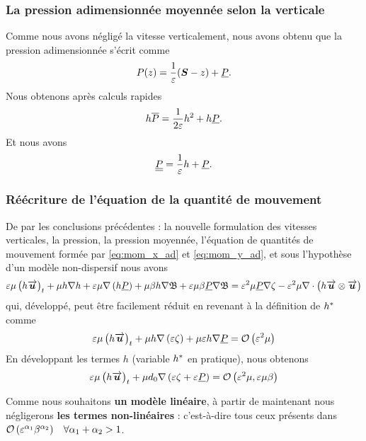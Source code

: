 \subsubsection{La pression adimensionnée moyennée selon la verticale}
\noindent Comme nous avons négligé la vitesse verticalement, nous avons obtenu que la pression adimensionnée s'écrit comme
\begin{equation*}
	P(z) =  \frac{1}{\varepsilon}(\boldsymbol{S}- z) +\underline{P}.
\end{equation*}
Nous obtenons après calculs rapides
\begin{equation}
	h\overline{P} = \frac{1}{2\varepsilon}h^2 + h\underline{P}.
\end{equation}
Et nous avons 
\begin{equation}
	\underline{\underline{P}} = \frac{1}{\varepsilon}h + \underline{P}.
\end{equation}

\subsubsection{Réécriture de l'équation de la quantité de mouvement}
\noindent De par les conclusions précédentes : la nouvelle formulation des vitesses verticales, la pression, la pression moyennée, l'équation de quantités de mouvement formée par \eqref{eq:mom_x_ad} et \eqref{eq:mom_y_ad}, et sous l'hypothèse d'un modèle non-dispersif nous avons
\begin{equation}
	\varepsilon\mu\left(h\overrightarrow{\boldsymbol{u}}\right)_t + \mu h \nabla h + \varepsilon\mu\nabla\left(h\underline{P}\right) + \mu\beta h \nabla\mathfrak{B} + \varepsilon\mu\beta\underline{P}\nabla\mathfrak{B} = \varepsilon^2\mu\underline{P} \nabla \zeta  -\varepsilon^2\mu \nabla \cdot \left(h\overrightarrow{\boldsymbol{u}}\otimes\overrightarrow{\boldsymbol{u}}\right)
\end{equation}
qui, développé, peut être facilement réduit en revenant à la définition de ${{h}^{*}}$ comme 
\begin{equation}
	\varepsilon\mu\left(h\overrightarrow{\boldsymbol{u}}\right)_t + \mu h \nabla \left(\varepsilon \zeta\right) +\mu\varepsilon h\nabla \underline{P} = \mathcal{O}\left(\varepsilon^2\mu\right)
\end{equation}
En développant les termes $h$ (variable ${{h}^{*}}$ en pratique), nous obtenons
\begin{equation}
\varepsilon\mu\left(h\overrightarrow{\boldsymbol{u}}\right)_t + \mu d_0 \nabla \left(\varepsilon \zeta +\varepsilon\underline{P}\right) = \mathcal{O}\left(\varepsilon^2\mu, \varepsilon\mu\beta\right)
\end{equation}
\begin{refe}
Comme nous souhaitons \textbf{un modèle linéaire}, à partir de maintenant nous négligerons \textbf{les termes non-linéaires} : c'est-à-dire tous ceux présents dans $\mathcal{O}\left(\varepsilon^{\alpha_1}\beta^{\alpha_2}\right)\hspace{3mm}\forall\alpha_1+\alpha_2 > 1$.
\end{refe}

